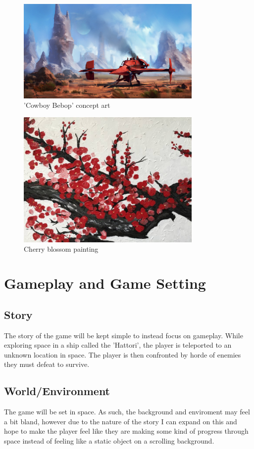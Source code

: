 \documentclass[a4paper]{scrreprt}
\begin{document}
\begin{figure}[h]
  \centering
  \includegraphics[width=0.8\textwidth]{Spaceship}
  \caption{'Cowboy Bebop' concept art}
  \end{figure}

  \begin{figure}[h]
    \centering
    \includegraphics[width=0.8\textwidth]{cherry}
    \caption{Cherry blossom painting}
    \end{figure}
\chapter{Gameplay and Game Setting}
\section{Story}
The story of the game will be kept simple to instead focus on gameplay. While exploring space in a ship called the 'Hattori', the player is teleported to an unknown location in space. The player is then confronted by horde of enemies they must defeat to survive.

\section{World/Environment}
The game will be set in space. As such, the background and enviroment may feel a bit bland, however due to the nature of the story I can expand on this and hope to make the player feel like they are making some kind of progress through space instead of feeling like a static object on a scrolling background. 
\end{document}
